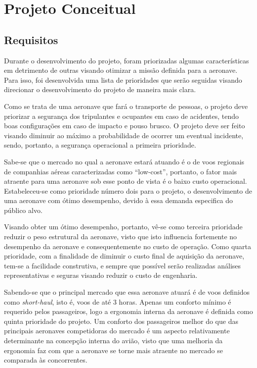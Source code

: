 \chapter{Projeto Conceitual}


\section{Requisitos}
\label{requisitos}
	
Durante o desenvolvimento do projeto, foram priorizadas algumas características em detrimento de outras visando otimizar a missão definida para a aeronave.
Para isso, foi desenvolvida uma lista de prioridades que serão seguidas visando direcionar o desenvolvimento do projeto de maneira mais clara. 
	
Como se trata de uma aeronave que fará o transporte de pessoas, o projeto deve priorizar a segurança dos tripulantes e ocupantes em caso de acidentes, tendo boas configurações em caso de impacto e pouso brusco.
O projeto deve ser feito visando diminuir ao máximo a probabilidade de ocorrer um eventual incidente, sendo, portanto, a segurança operacional a primeira prioridade.

Sabe-se que o mercado no qual a aeronave estará atuando é o de voos regionais de companhias aéreas caracterizadas como “low-cost”, portanto, o fator mais atraente para uma aeronave sob esse ponto de vista é o baixo custo operacional.
Estabeleceu-se como prioridade número dois para o projeto, o desenvolvimento de uma aeronave com ótimo desempenho, devido à essa demanda especifica do público alvo.

Visando obter um ótimo desempenho, portanto, vê-se como terceira prioridade reduzir o peso estrutural da aeronave, visto que isto influencia fortemente no desempenho da aeronave e consequentemente no custo de operação.
Como quarta prioridade, com a finalidade de diminuir o custo final de aquisição da aeronave, tem-se a facilidade construtiva, e sempre que possível serão realizadas análises representativas e seguras visando reduzir o custo de engenharia.

Sabendo-se que o principal mercado que essa aeronave atuará é de voos definidos como \emph{short-haul}, isto é, voos de até 3 horas.
Apenas um conforto mínimo é requerido pelos passageiros, logo a ergonomia interna da aeronave é definida como quinta prioridade do projeto.
Um conforto dos passageiros melhor do que das principais aeronaves competidoras do mercado é um aspecto relativamente determinante na concepção interna do avião, visto que uma melhoria da ergonomia faz com que a aeronave se torne mais atraente no mercado se comparada às concorrentes.


